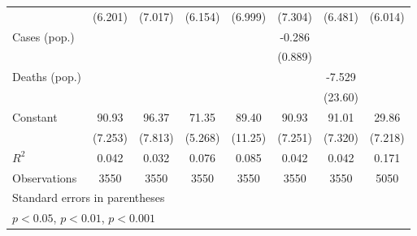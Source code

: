 \documentclass{article}
\begin{document}
{\begin{longtable}{l*{7}{c}}
                &  (6.201)         &  (7.017)         &  (6.154)         &  (6.999)         &  (7.304)         &  (6.481)         &  (6.014)         \\
Cases (pop.)    &                  &                  &                  &                  &   -0.286         &                  &                  \\
                &                  &                  &                  &                  &  (0.889)         &                  &                  \\
Deaths (pop.)   &                  &                  &                  &                  &                  &   -7.529         &                  \\
                &                  &                  &                  &                  &                  &  (23.60)         &                  \\
Constant        &    90.93\sym{***}&    96.37\sym{***}&    71.35\sym{***}&    89.40\sym{***}&    90.93\sym{***}&    91.01\sym{***}&    29.86\sym{***}\\
                &  (7.253)         &  (7.813)         &  (5.268)         &  (11.25)         &  (7.251)         &  (7.320)         &  (7.218)         \\
\hline
\(R^{2}\)       &    0.042         &    0.032         &    0.076         &    0.085         &    0.042         &    0.042         &    0.171         \\
Observations    &     3550         &     3550         &     3550         &     3550         &     3550         &     3550         &     5050         \\
\hline\hline
\multicolumn{8}{l}{\footnotesize Standard errors in parentheses}\\
\multicolumn{8}{l}{\footnotesize \sym{*} \(p<0.05\), \sym{**} \(p<0.01\), \sym{***} \(p<0.001\)}\\
\end{longtable}
}
\end{document}

